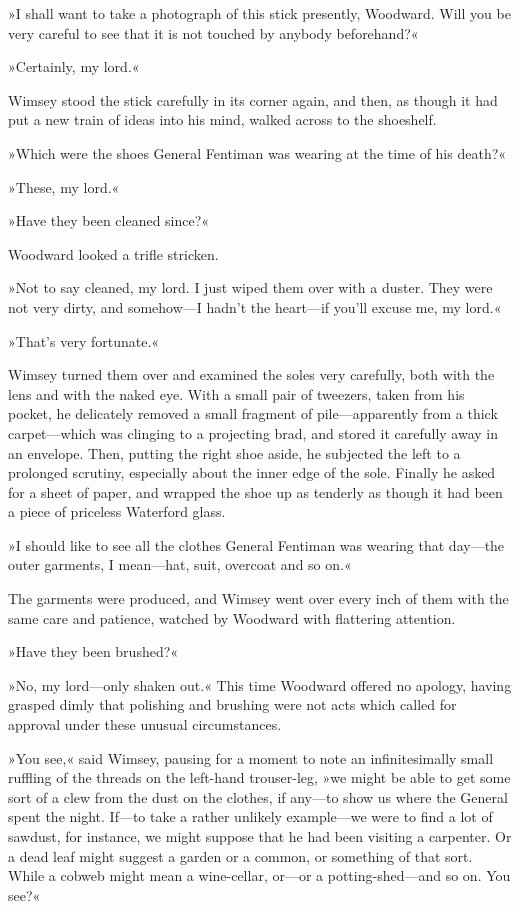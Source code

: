 »I shall want to take a photograph of this stick presently, Woodward. Will you be very careful to see that it is not touched by anybody beforehand?«

»Certainly, my lord.«

Wimsey stood the stick carefully in its corner again, and then, as though it had put a new train of ideas into his mind, walked across to the shoeshelf.

»Which were the shoes General Fentiman was wearing at the time of his death?«

»These, my lord.«

»Have they been cleaned since?«

Woodward looked a trifle stricken.

»Not to say cleaned, my lord. I just wiped them over with a duster. They were not very dirty, and somehow—I hadn't the heart—if you'll excuse me, my lord.«

»That's very fortunate.«

Wimsey turned them over and examined the soles very carefully, both with the lens and with the naked eye. With a small pair of tweezers, taken from his pocket, he delicately removed a small fragment of pile—apparently from a thick carpet—which was clinging to a projecting brad, and stored it carefully away in an envelope. Then, putting the right shoe aside, he subjected the left to a prolonged scrutiny, especially about the inner edge of the sole. Finally he asked for a sheet of paper, and wrapped the shoe up as tenderly as though it had been a piece of priceless Waterford glass.

»I should like to see all the clothes General Fentiman was wearing that day—the outer garments, I mean—hat, suit, overcoat and so on.«

The garments were produced, and Wimsey went over every inch of them with the same care and patience, watched by Woodward with flattering attention.

»Have they been brushed?«

»No, my lord—only shaken out.« This time Woodward offered no apology, having grasped dimly that polishing and brushing were not acts which called for approval under these unusual circumstances.

»You see,« said Wimsey, pausing for a moment to note an infinitesimally small ruffling of the threads on the left-hand trouser-leg, »we might be able to get some sort of a clew from the dust on the clothes, if any—to show us where the General spent the night. If—to take a rather unlikely example—we were to find a lot of sawdust, for instance, we might suppose that he had been visiting a carpenter. Or a dead leaf might suggest a garden or a common, or something of that sort. While a cobweb might mean a wine-cellar, or—or a potting-shed—and so on. You see?«

